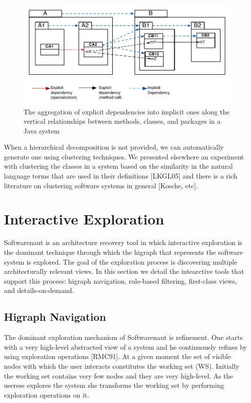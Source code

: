 \documentclass[preprint,12pt]{elsarticle}
\begin{document}
\begin{figure}[h]
\begin{center}
\includegraphics[width=\linewidth]{images/DependencyAggregation}
\caption{The aggregation of explicit dependencies into implicit ones along the vertical relationships between methods, classes, and packages in a Java system}
\label{dep-agg}
\end{center}
\end{figure}
When a hierarchical decomposition is not provided, we can automatically generate one using clustering techniques. We presented elsewhere an experiment with clustering the classes in a system based on the similarity in the natural language terms that are used in their definitions [LKGL05] and there is a rich literature on clustering software systems in general [Kosche, etc].


\section {Interactive Exploration}
\label {sec:interact}

Softwarenaut is an architecture recovery tool in which interactive exploration is the dominant technique through which the higraph that represents the software system is explored. The goal of the exploration process is discovering multiple architecturally relevant views. In this section we detail the intearctive tools that support this process: higraph navigation, rule-based filtering, first-class views, and details-on-demand.  

\subsection{Higraph Navigation}

The dominant exploration mechanism of Softwarenaut is refinement. One starts with a very high-level abstracted view of a system and he continuously refines by using exploration operations [RMC91]. At a given moment the set of visible nodes with which the user interacts constitutes the working set (WS). Initially the working set contains very few nodes and they are very high-level. As the useress explores the system she transforms the working set by performing exploration operations on it. 
\end{document}
